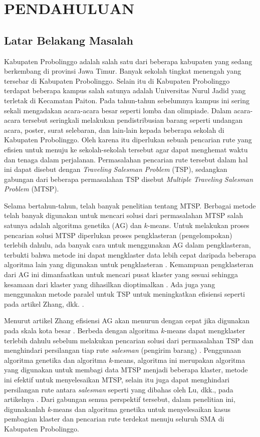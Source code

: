 \chapter{PENDAHULUAN}

\section{Latar Belakang Masalah}

Kabupaten Probolinggo adalah salah satu dari beberapa kabupaten yang sedang berkembang di provinsi Jawa Timur. Banyak sekolah tingkat menengah yang tersebar di Kabupaten Probolinggo. Selain itu di Kabupaten Probolinggo terdapat beberapa kampus salah satunya adalah Universitas Nurul Jadid yang terletak di Kecamatan Paiton. Pada tahun-tahun sebelumnya kampus ini sering sekali mengadakan acara-acara besar seperti lomba dan olimpiade. Dalam acara-acara tersebut seringkali melakukan pendistribusian barang seperti undangan acara, poster, surat selebaran, dan lain-lain kepada beberapa sekolah di Kabupaten Probolinggo. Oleh karena itu diperlukan sebuah pencarian rute yang efisien untuk menuju ke sekolah-sekolah tersebut agar dapat menghemat waktu dan tenaga dalam perjalanan. Permasalahan pencarian rute tersebut dalam hal ini dapat disebut dengan \textit{Traveling Salesman Problem} (TSP), sedangkan gabungan dari beberapa permasalahan TSP disebut \textit{Multiple Traveling Salesman Problem} (MTSP).

Selama bertahun-tahun, telah banyak penelitian tentang MTSP. Berbagai metode telah banyak digunakan untuk mencari solusi dari permasalahan MTSP salah satunya adalah algoritma genetika (AG) dan $k$-means. Untuk melakukan proses pencarian solusi MTSP diperlukan proses pengklasteran (pengelompokan) terlebih dahulu, ada banyak cara untuk menggunakan AG dalam pengklasteran, terbukti bahwa metode ini dapat mengklaster data lebih cepat daripada beberapa algoritma lain yang digunakan untuk pengklasteran \cite{krishna1999genetic}. Kemampuan pengklasteran dari AG ini dimanfaatkan untuk mencari pusat klaster yang sesuai sehingga kesamaan dari klaster yang dihasilkan dioptimalkan \cite{maii2000genetic}. Ada juga yang menggunakan metode paralel untuk TSP untuk meningkatkan efisiensi seperti pada artikel Zhang, dkk. \cite{li2016parallel}.

Menurut artikel Zhang efisiensi AG akan menurun dengan cepat jika digunakan pada skala kota besar \cite{zhang2014parallel}. Berbeda dengan algoritma $k$-means dapat mengklaster terlebih dahulu sebelum melakukan pencarian solusi dari permasalahan TSP dan menghindari persilangan tiap rute \textit{salesman} (pengirim barang) \cite{inproceedings}. Penggunaan algoritma genetika dan algoritma \textit{k}-means, algoritma ini merupakan algoritma yang digunakan untuk membagi data MTSP menjadi beberapa klaster, metode ini efektif untuk menyelesaikan MTSP, selain itu juga dapat menghindari persilangan rute antara \textit{salesman} seperti yang dibahas oleh Lu, dkk., pada artikelnya \cite{inproceedings}. Dari gabungan semua perspektif tersebut, dalam penelitian ini, digunakanlah \textit{k}-means dan algoritma genetika untuk menyelesaikan kasus pembagian klaster dan pencarian rute terdekat menuju seluruh SMA di Kabupaten Probolinggo.

